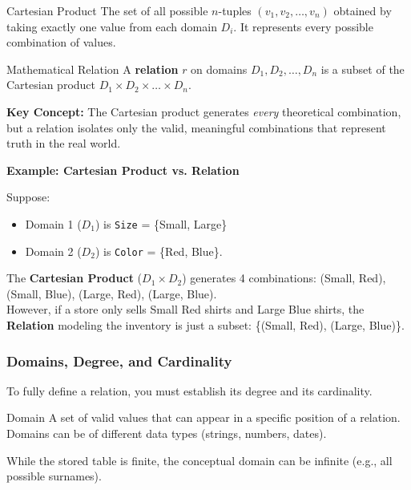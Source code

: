 \begin{defbox}{Cartesian Product}
The set of all possible $n$-tuples $(v_1, v_2, \dots, v_n)$ obtained by taking exactly one value from each domain $D_i$. It represents every possible combination of values.
\end{defbox}

\begin{defbox}{Mathematical Relation}
A \textbf{relation} $r$ on domains $D_1, D_2, \dots, D_n$ is a subset of the Cartesian product $D_1 \times D_2 \times \dots \times D_n$. 
\end{defbox}

\textbf{Key Concept:} The Cartesian product generates \emph{every} theoretical combination, but a relation isolates only the valid, meaningful combinations that represent truth in the real world.

\vspace{0.2cm}
\begin{example}{\textbf{Example: Cartesian Product vs. Relation}}

Suppose: 
\begin{itemize}
  \item Domain 1 ($D_1$) is \texttt{Size} = \{Small, Large\}
  \item  Domain 2 ($D_2$) is \texttt{Color} = \{Red, Blue\}.
\end{itemize}

The \textbf{Cartesian Product} ($D_1 \times D_2$) generates 4 combinations: (Small, Red), (Small, Blue), (Large, Red), (Large, Blue).\\
However, if a store only sells Small Red shirts and Large Blue shirts, the \textbf{Relation} modeling the inventory is just a subset: \{(Small, Red), (Large, Blue)\}.
\end{example}

\subsubsection{Domains, Degree, and Cardinality}
To fully define a relation, you must establish its degree and its cardinality.

\begin{defbox}{Domain}
A set of valid values that can appear in a specific position of a relation. Domains can be of different data types (strings, numbers, dates).  
\end{defbox}

While the stored table is finite, the conceptual domain can be infinite (e.g., all possible surnames).

